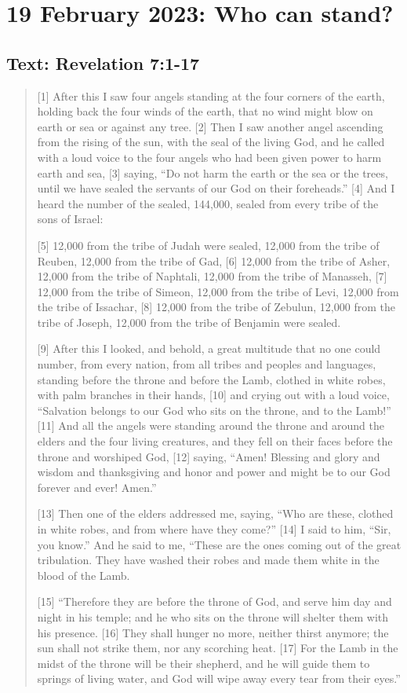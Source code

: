 \section{19 February 2023: Who can stand?}
\subsection*{Text: Revelation 7:1-17}
  \begin{quote}
    [1] After this I saw four angels standing at the four corners of the
    earth, holding back the four winds of the earth, that no wind might blow
    on earth or sea or against any tree.  [2] Then I saw another angel
    ascending from the rising of the sun, with the seal of the living God,
    and he called with a loud voice to the four angels who had been given
    power to harm earth and sea, [3] saying, “Do not harm the earth or the
    sea or the trees, until we have sealed the servants of our God on their
    foreheads.” [4] And I heard the number of the sealed, 144,000, sealed
    from every tribe of the sons of Israel:

    [5] 12,000 from the tribe of Judah were sealed,
    12,000 from the tribe of Reuben,
    12,000 from the tribe of Gad,
    [6] 12,000 from the tribe of Asher,
    12,000 from the tribe of Naphtali,
    12,000 from the tribe of Manasseh,
    [7] 12,000 from the tribe of Simeon,
    12,000 from the tribe of Levi,
    12,000 from the tribe of Issachar,
    [8] 12,000 from the tribe of Zebulun,
    12,000 from the tribe of Joseph,
    12,000 from the tribe of Benjamin were sealed.


    [9] After this I looked, and behold, a great multitude that no one could
    number, from every nation, from all tribes and peoples and languages,
    standing before the throne and before the Lamb, clothed in white robes,
    with palm branches in their hands, [10] and crying out with a loud voice,
    “Salvation belongs to our God who sits on the throne, and to the Lamb!”
    [11] And all the angels were standing around the throne and around the
    elders and the four living creatures, and they fell on their faces before
    the throne and worshiped God, [12] saying, “Amen!  Blessing and glory and
    wisdom and thanksgiving and honor and power and might be to our God
    forever and ever!  Amen.”

    [13] Then one of the elders addressed me, saying, “Who are these, clothed
    in white robes, and from where have they come?” [14] I said to him, “Sir,
    you know.” And he said to me, “These are the ones coming out of the great
    tribulation.  They have washed their robes and made them white in the
    blood of the Lamb.

    [15] “Therefore they are before the throne of God,
        and serve him day and night in his temple;
        and he who sits on the throne will shelter them with his presence.
    [16] They shall hunger no more, neither thirst anymore;
        the sun shall not strike them,
        nor any scorching heat.
    [17] For the Lamb in the midst of the throne will be their shepherd,
        and he will guide them to springs of living water,
    and God will wipe away every tear from their eyes.”
  \end{quote}
